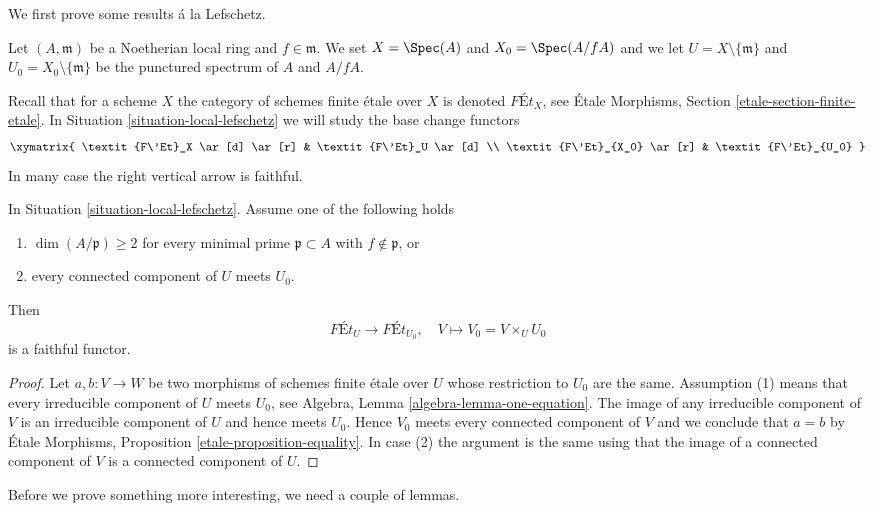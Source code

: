 \noindent
We first prove some results \'a la Lefschetz.

\begin{situation}
\label{situation-local-lefschetz}
Let $(A, \mathfrak m)$ be a Noetherian local ring and $f \in \mathfrak m$.
We set $X = \Spec(A)$ and $X_0 = \Spec(A/fA)$ and we
let $U = X \setminus \{\mathfrak m\}$ and
$U_0 = X_0 \setminus \{\mathfrak m\}$ be the punctured spectrum of
$A$ and $A/fA$.
\end{situation}

\noindent
Recall that for a scheme $X$ the category of schemes finite
\'etale over $X$ is denoted $\textit{F\'Et}_X$, see
\'Etale Morphisms, Section \ref{etale-section-finite-etale}.
In Situation \ref{situation-local-lefschetz}
we will study the base change functors
$$
\xymatrix{
\textit{F\'Et}_X \ar[d] \ar[r] & \textit{F\'Et}_U \ar[d] \\
\textit{F\'Et}_{X_0} \ar[r] & \textit{F\'Et}_{U_0}
}
$$
In many case the right vertical arrow is faithful.

\begin{lemma}
\label{lemma-faithful}
In Situation \ref{situation-local-lefschetz}.
Assume one of the following holds
\begin{enumerate}
\item $\dim(A/\mathfrak p) \geq 2$ for every minimal prime
$\mathfrak p \subset A$ with $f \not \in \mathfrak p$, or
\item every connected component of $U$ meets $U_0$.
\end{enumerate}
Then
$$
\textit{F\'Et}_U \longrightarrow \textit{F\'Et}_{U_0},\quad
V \longmapsto V_0 = V \times_U U_0
$$
is a faithful functor.
\end{lemma}

\begin{proof}
Let $a, b : V \to W$ be two morphisms of schemes finite \'etale over $U$
whose restriction to $U_0$ are the same. Assumption (1)
means that every irreducible component of $U$ meets $U_0$, see
Algebra, Lemma \ref{algebra-lemma-one-equation}.
The image of any irreducible component of $V$ is an
irreducible component of $U$ and hence meets $U_0$.
Hence $V_0$ meets every connected component of $V$ and
we conclude that $a = b$ by \'Etale Morphisms, Proposition
\ref{etale-proposition-equality}.
In case (2) the argument is the same using that the image
of a connected component of $V$ is a connected component of $U$.
\end{proof}

\noindent
Before we prove something more interesting, we need a couple of lemmas.

